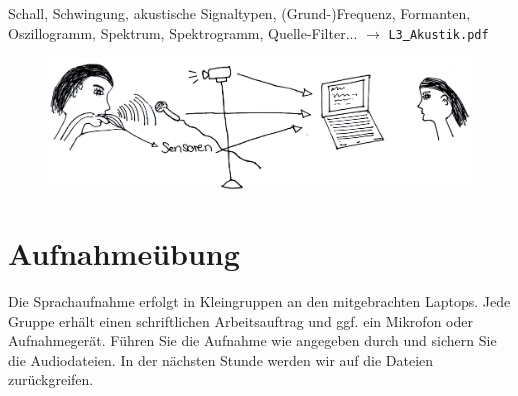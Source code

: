 \documentclass[11pt]{book}
\begin{document}
Schall, Schwingung, akustische Signaltypen, (Grund-)Frequenz, Formanten, Oszillogramm, Spektrum, Spektrogramm, Quelle-Filter... $\rightarrow$ {\tt L3\underline{\ }Akustik.pdf}
\begin{figure}[htbp]
\begin{center}
\includegraphics[width=\textwidth]{grafiken/sprachaufnahme/sprechen-erfassen}
\label{t2}
\end{center}
\end{figure}

\section{Aufnahmeübung}


Die Sprachaufnahme erfolgt in Kleingruppen an den mitgebrachten Laptops. Jede Gruppe erhält einen schriftlichen Arbeitsauftrag und ggf. ein Mikrofon oder Aufnahmegerät. Führen Sie die Aufnahme wie angegeben durch und sichern Sie die Audiodateien. In der nächsten Stunde werden wir auf die Dateien zurückgreifen.
\vspace*{7cm} 
\end{document}

